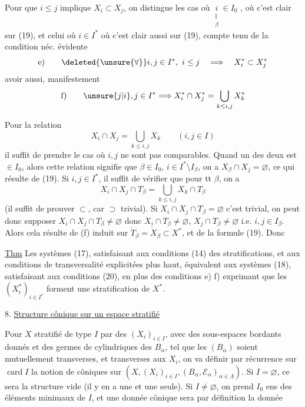 Pour  que 
$i\le j$  implique $X_i\subset X_j$,
on distingue les cas où $\underset{\substack{\Vert\\\beta}}{i}\in I_0$
, où c'est
clair sur (19), et celui où $i\in I^*$ où  c'est
clair aussi sur (19), compte tenu de la condition
néc. évidente
\[
\text{e)}\qquad \deleted{\unsure{\forall}} i,j\in I^*,\ i\le j
\quad\Longrightarrow\quad X_i^*\subset X_j^*
\]
 avoir aussi, manifestement
\[
\text{f)}\qquad \unsure{j|i},j\in I^*\Longrightarrow
X_i^*\cap X_j^*=\bigcup_{k\le i,j}X_k^*
\]

Pour la relation
\[
X_i\cap X_j=\bigcup_{k\le i,j}X_k\qquad(i,j\in I)
\]
il  suffit de prendre le cas où $i,j$ ne
sont pas comparables. Quand un des deux
est $\in I_0$, alors cette relation  signifie que
$\beta\in I_0$, $i\in I^*\setminus I_\beta$, on a
$X_\beta\cap X_j=\varnothing$, ce qui résulte de (19).
Si $i,j\in I^*$, il suffit 
de vérifier que pour tt
$\beta$, on a
\[
X_i\cap X_j\cap T_\beta=\bigcup_{k\le i,j}X_k\cap T_\beta
\]
(il suffit de prouver $\subset$, car $\supset$ trivial). Si
$X_i\cap X_j\cap T_\beta=\varnothing$ c'est trivial, on peut donc supposer
$X_i\cap X_j\cap T_\beta\ne\varnothing$
donc $X_i\cap T_\beta\ne\varnothing$, $X_j\cap T_\beta\ne\varnothing$
i.e. $i,j\in I_\beta$. Alors  cela résulte de
(f) induit sur $\dot T_\beta=\dot X_\beta\subset X^*$,
et de la formule (19). Donc

\uline{Thm} Les systèmes (17), satisfaisant aux
conditions  (14) des stratifications, et aux
conditions de transversalité explicitées plus
haut, équivalent aux systèmes (18), satisfaisant
aux conditions (20), en plus des conditions
e) f) exprimant que les $(X_i^*)_{i\in I^*}$ forment une
stratification de $X^*$.

8. \uline{Structure cônique sur un espace stratifié}

Pour $X$ stratifié de type $I$ par des
$(X_i)_{i\in I}$, avec des sous-espaces bordants donnés
et des germes de  cylindriques des $B_\alpha$, tel que
les $(B_\alpha)$ soient mutuellement transverses, et
transverses aux $X_i$, on va  définir
par récurrence sur $\operatorname{card}I$ la notion de
  côniques sur 
$(X,(X_i)_{i\in I},(B_\alpha,\mathcal E_\alpha)_{\alpha\in\Lambda})$.
 Si $I=\varnothing$, ce sera la structure
vide (il y en a une et une seule). Si
$I\ne\varnothing$, on prend $I_0$ ens des éléments minimaux
de $I$, et une donnée cônique sera par
définition la donnée

